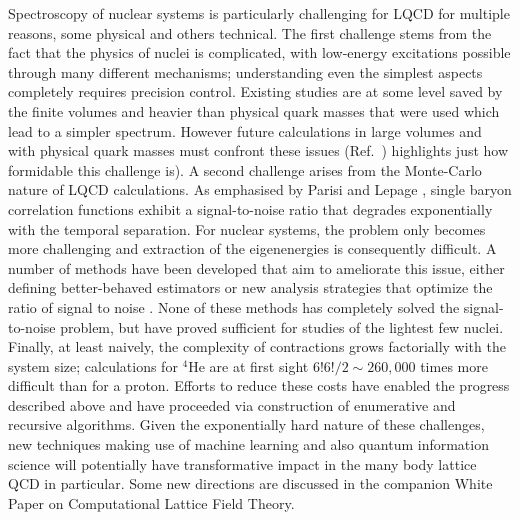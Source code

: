 Spectroscopy of nuclear systems is particularly challenging for LQCD for multiple reasons, some physical and others technical. The first challenge stems from the fact that the physics of nuclei is complicated, with low-energy excitations possible through many different mechanisms; understanding even the simplest aspects completely requires precision control. Existing studies are at some level saved by the finite volumes and heavier than physical quark masses that were used which lead to a simpler spectrum. However future calculations in large volumes and with physical quark masses must confront these issues (Ref.~)\cite{Beane:2012vq} highlights just how formidable this challenge is).
A second challenge arises from the Monte-Carlo nature of LQCD calculations. As emphasised by Parisi and Lepage \cite{Lepage:1989hd,Parisi:1983ae,Hamber:1983vu}, single baryon correlation functions exhibit a signal-to-noise ratio that degrades exponentially with the temporal separation. For nuclear systems, the problem only becomes more challenging \cite{Beane:2009kya,Beane:2009gs} and extraction of the eigenenergies is consequently difficult. A number of methods have been developed that aim to ameliorate this issue, either defining better-behaved estimators \cite{Beane:2014oea,Wagman:2017gqi,Wagman:2017xfh,Wagman:2016bam,Detmold:2018eqd} or new analysis strategies that optimize the ratio of signal to noise \cite{Detmold:2014hla}. None of these methods has completely solved the signal-to-noise problem, but have proved sufficient for studies of the lightest few nuclei. 
Finally, at least naively, the complexity of contractions grows 
factorially with the system size; calculations for $^4$He are at first sight $6!6!/2\sim 260,000$ times  more difficult than for a proton. Efforts to reduce these costs have enabled the progress described above and have proceeded via construction of enumerative \cite{Doi:2012xd,Gunther:2013xj} and recursive \cite{Detmold:2010au,Detmold:2012eu} algorithms. 
Given the exponentially hard nature of these challenges, new techniques making use of machine learning and also quantum information science will potentially have transformative  impact 
in the many body lattice QCD in particular. Some new directions are discussed in the companion White Paper on Computational Lattice Field Theory.


